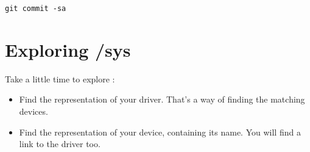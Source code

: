\begin{verbatim}
git commit -sa 
\end{verbatim}

\section{Exploring /sys}

Take a little time to explore :

\begin{itemize}
\item Find the representation of your driver. That's a way
      of finding the matching devices.
\item Find the representation of your device, containing its name.
      You will find a link to the driver too.
\end{itemize}
